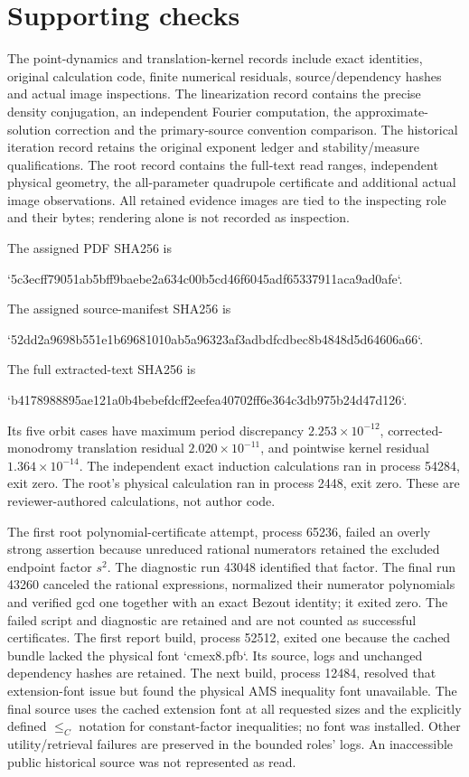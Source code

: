 \documentclass[10pt]{article}
\begin{document}
\section*{Supporting checks}
The point-dynamics and translation-kernel records include exact identities, original calculation code, finite numerical residuals, source/dependency hashes and actual image inspections. The linearization record contains the precise density conjugation, an independent Fourier computation, the approximate-solution correction and the primary-source convention comparison. The historical iteration record retains the original exponent ledger and stability/measure qualifications. The root record contains the full-text read ranges, independent physical geometry, the all-parameter quadrupole certificate and additional actual image observations. All retained evidence images are tied to the inspecting role and their bytes; rendering alone is not recorded as inspection.\par
The assigned PDF SHA256 is\par
`5c3ecff79051ab5bff9baebe2a634c00b5cd46f6045adf65337911aca9ad0afe`.\par
The assigned source-manifest SHA256 is\par
`52dd2a9698b551e1b69681010ab5a96323af3adbdfcdbec8b4848d5d64606a66`.\par
The full extracted-text SHA256 is\par
`b4178988895ae121a0b4bebefdcff2eefea40702ff6e364c3db975b24d47d126`.\par
Its five orbit cases have maximum period discrepancy \(2.253\times10^{-12}\), corrected-monodromy translation residual \(2.020\times10^{-11}\), and pointwise kernel residual \(1.364\times10^{-14}\). The independent exact induction calculations ran in process 54284, exit zero. The root’s physical calculation ran in process 2448, exit zero. These are reviewer-authored calculations, not author code.\par
The first root polynomial-certificate attempt, process 65236, failed an overly strong assertion because unreduced rational numerators retained the excluded endpoint factor \(s^2\). The diagnostic run 43048 identified that factor. The final run 43260 canceled the rational expressions, normalized their numerator polynomials and verified gcd one together with an exact Bezout identity; it exited zero. The failed script and diagnostic are retained and are not counted as successful certificates. The first report build, process 52512, exited one because the cached bundle lacked the physical font `cmex8.pfb`. Its source, logs and unchanged dependency hashes are retained. The next build, process 12484, resolved that extension-font issue but found the physical AMS inequality font unavailable. The final source uses the cached extension font at all requested sizes and the explicitly defined \(\leq_C\) notation for constant-factor inequalities; no font was installed. Other utility/retrieval failures are preserved in the bounded roles’ logs. An inaccessible public historical source was not represented as read.\par
\end{document}
